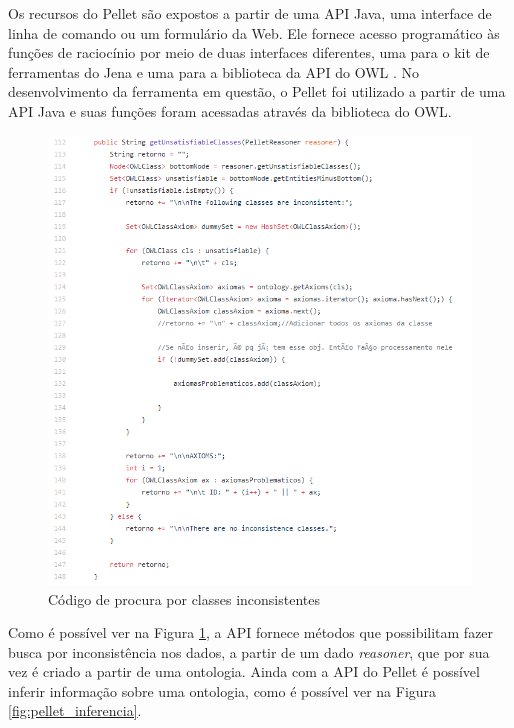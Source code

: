 \documentclass{bcc}
\begin{document}
Os recursos do Pellet são expostos a partir de uma API Java, uma interface de linha de comando ou um formulário da Web. Ele fornece acesso programático às funções de raciocínio por meio de duas interfaces diferentes, uma para o kit de ferramentas do Jena e uma para a biblioteca da API do OWL \cite{parsia2004}. No desenvolvimento da ferramenta em questão, o Pellet foi utilizado a partir de uma API Java e suas funções foram acessadas através da biblioteca do OWL. 

\begin{figure}[H]
\centering
\includegraphics[width=1\textwidth]{Figuras/pellet_inconsistencia.png}
\caption{Código de procura por classes inconsistentes}
\label{fig:pellet_inconsistencia}
\end{figure}

Como é possível ver na Figura \ref{fig:pellet_inconsistencia}, a API fornece métodos que possibilitam fazer busca por inconsistência nos dados, a partir de um dado \textit{reasoner}, que por sua vez é criado a partir de uma ontologia. Ainda com a API do Pellet é possível inferir informação sobre uma ontologia, como é possível ver na Figura \ref{fig:pellet_inferencia}.
\end{document}
